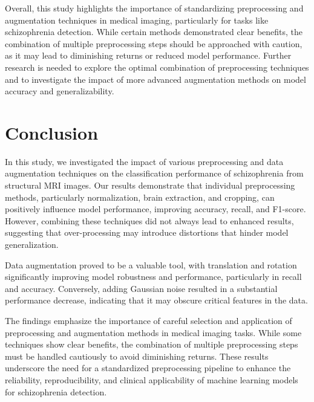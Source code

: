 Overall, this study highlights the importance of standardizing preprocessing and augmentation techniques in medical imaging, particularly for tasks like schizophrenia detection. While certain methods demonstrated clear benefits, the combination of multiple preprocessing steps should be approached with caution, as it may lead to diminishing returns or reduced model performance. Further research is needed to explore the optimal combination of preprocessing techniques and to investigate the impact of more advanced augmentation methods on model accuracy and generalizability.





\section{Conclusion}

In this study, we investigated the impact of various preprocessing and data augmentation techniques on the classification performance of schizophrenia from structural MRI images. Our results demonstrate that individual preprocessing methods, particularly normalization, brain extraction, and cropping, can positively influence model performance, improving accuracy, recall, and F1-score. However, combining these techniques did not always lead to enhanced results, suggesting that over-processing may introduce distortions that hinder model generalization.

Data augmentation proved to be a valuable tool, with translation and rotation significantly improving model robustness and performance, particularly in recall and accuracy. Conversely, adding Gaussian noise resulted in a substantial performance decrease, indicating that it may obscure critical features in the data.

The findings emphasize the importance of careful selection and application of preprocessing and augmentation methods in medical imaging tasks. While some techniques show clear benefits, the combination of multiple preprocessing steps must be handled cautiously to avoid diminishing returns. These results underscore the need for a standardized preprocessing pipeline to enhance the reliability, reproducibility, and clinical applicability of machine learning models for schizophrenia detection.

